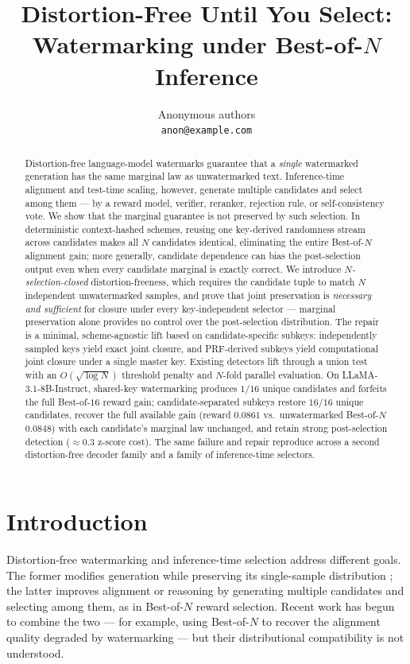 \documentclass{article} %
\title{Distortion-Free Until You Select:\\
Watermarking under Best-of-$N$ Inference}
\author{Anonymous authors\\
\texttt{anon@example.com}}
\begin{document}
\maketitle

\begin{abstract}
Distortion-free language-model watermarks guarantee that a \emph{single}
watermarked generation has the same marginal law as unwatermarked text.
Inference-time alignment and test-time scaling, however, generate multiple
candidates and select among them --- by a reward model, verifier, reranker,
rejection rule, or self-consistency vote. We show that the marginal guarantee
is not preserved by such selection. In deterministic context-hashed schemes,
reusing one key-derived randomness stream across candidates makes all $N$
candidates identical, eliminating the entire Best-of-$N$ alignment gain; more
generally, candidate dependence can bias the post-selection output even when
every candidate marginal is exactly correct. We introduce
\emph{$N$-selection-closed} distortion-freeness, which requires the candidate
tuple to match $N$ independent unwatermarked samples, and prove that joint
preservation is \emph{necessary and sufficient} for closure under every
key-independent selector --- marginal preservation alone provides no control
over the post-selection distribution. The repair is a minimal, scheme-agnostic
lift based on candidate-specific subkeys: independently sampled keys yield
exact joint closure, and PRF-derived subkeys yield computational joint closure
under a single master key. Existing detectors lift through a union test with an
$O(\sqrt{\log N})$ threshold penalty and $N$-fold parallel evaluation. On
LLaMA-3.1-8B-Instruct, shared-key watermarking produces $1/16$ unique
candidates and forfeits the full Best-of-$16$ reward gain; candidate-separated
subkeys restore $16/16$ unique candidates, recover the full available gain
(reward $0.0861$ vs.\ unwatermarked Best-of-$N$ $0.0848$) with each candidate's
marginal law unchanged, and retain strong post-selection detection
($\approx0.3$ z-score cost). The same failure and repair reproduce across a
second distortion-free decoder family and a family of inference-time
selectors.
\end{abstract}

\section{Introduction}
Distortion-free watermarking and inference-time selection address different
goals. The former modifies generation while preserving its single-sample
distribution \citep{aaronson2023, kuditipudi2023robust, zhao2024permute}; the
latter improves alignment or reasoning by generating multiple candidates and
selecting among them, as in Best-of-$N$ reward selection. Recent work has
begun to combine the two --- for example, using Best-of-$N$ to recover the
alignment quality degraded by watermarking \citep{verma2025watermarking} ---
but their distributional compatibility is not understood.
\end{document}
